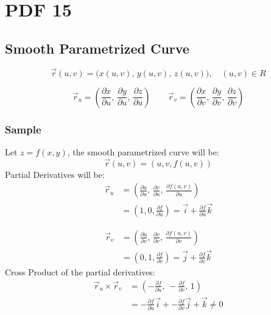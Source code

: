 \documentclass[12pt, fleqn]{book}
\begin{document}
\chapter{PDF 15}\label{pdf15}
	\section{Smooth Parametrized Curve}
		\begin{equation}
			\vec{r}(u, v) = \big(x(u, v), \, y(u, v), \, z(u, v)\big), \quad (u, v) \in R
		\end{equation}
		
		\begin{equation}
			\vec{r}_u = (\frac{\partial x}{\partial u}, \, \frac{\partial y}{\partial u}, \, \frac{\partial z}{\partial u}) \qquad \vec{r}_v = (\frac{\partial x}{\partial v}, \, \frac{\partial y}{\partial v}, \, \frac{\partial z}{\partial v}) 
		\end{equation}	
		\subsection{Sample}
			Let $z = f(x, y)$, the smooth parametrized curve will be:
				\begin{equation}
					\vec{r}(u, v) = (u, v, f(u, v))
				\end{equation}
		 	Partial Derivatives will be:
			 	\begin{equation}
				 	\begin{split}
				 		\vec{r}_u 
				 		& = (
				 			\frac{\partial u}{\partial u}, \,
				 			\frac{\partial v}{\partial u}, \,
				 			\frac{\partial f(u, v)}{\partial u}
				 		) \\
				 		& = (1, 0, \frac{\partial f}{\partial u})
			              = \vec{i} + \frac{\partial f}{\partial u} \vec{k}
				 	\end{split}
			 	\end{equation}
		 	
			 	\begin{equation}
				 	\begin{split}
						\vec{r}_v 
						& = (
								\frac{\partial u}{\partial v}, \,
								\frac{\partial v}{\partial v}, \,
								\frac{\partial f(u, v)}{\partial v}
							) \\
						& = (0, 1, \frac{\partial f}{\partial v})
						  = \vec{j} + \frac{\partial f}{\partial v} \vec{k}
					\end{split}
				\end{equation}
	 	    Cross Product of the partial derivatives:
	 	    \begin{equation}
				\begin{split}
					\vec{r}_u \times \vec{r}_v 
					& = (
						- \frac{\partial f}{\partial u}, \, 
						- \frac{\partial f}{\partial v}, \, 
						1
					) \\
					& = - \frac{\partial f}{\partial u} \vec{i} + 
					    - \frac{\partial f}{\partial v} \vec{j} + 
					    \vec{k} \neq 0
				\end{split}
			\end{equation}
\end{document}
